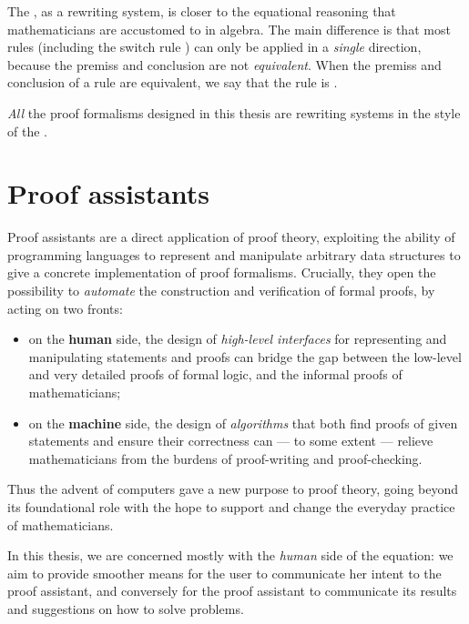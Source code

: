 The , as a rewriting system, is closer to the equational
reasoning that mathematicians are accustomed to in algebra. The main difference
is that most rules (including the switch rule ) can only be applied in a
\emph{single} direction, because the premiss and conclusion are not
\emph{equivalent}. When the
premiss and conclusion of a rule are equivalent, we say that the rule is
.

\begin{emphpar}
\emph{All} the proof formalisms designed in this thesis are 
rewriting systems in the style of the .
\end{emphpar}

\section{Proof assistants}

Proof assistants are a direct application of proof theory, exploiting the
ability of programming languages to represent and manipulate arbitrary data
structures to give a concrete implementation of proof formalisms. Crucially,
they open the possibility to \emph{automate} the construction and verification
of formal proofs, by acting on two fronts:
\begin{itemize}
  \item on the \textbf{human} side, the design of \emph{high-level interfaces}
  for representing and manipulating statements and proofs can bridge the gap
  between the low-level and very detailed proofs of formal logic, and the
  informal proofs of mathematicians;
  \item on the \textbf{machine} side, the design of \emph{algorithms} that both
  find proofs of given statements and ensure their correctness can --- to some
  extent --- relieve mathematicians from the
  burdens of proof-writing and proof-checking.
\end{itemize}
Thus the advent of computers gave a new purpose to proof theory, going beyond
its foundational role with the hope to support and change the everyday practice
of mathematicians.

\begin{emphpar}
In this thesis, we are concerned mostly with the \emph{human} side of the
equation: we aim to provide smoother means for the user to communicate her
intent to the proof assistant, and conversely for the proof assistant to
communicate its results and suggestions on how to solve problems.
\end{emphpar}

